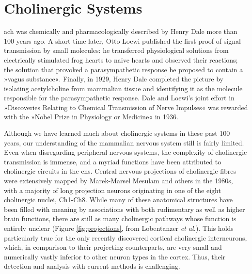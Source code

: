 \section{Cholinergic Systems}
 \Ac{ach} was chemically and pharmacologically described by Henry Dale more than 100 years ago.\cite{Dale1914} A short time later, Otto Loewi published the first proof of signal transmission by small molecules: he transferred physiological solutions from electrically stimulated frog hearts to naive hearts and observed their reactions; the solution that provoked a parasympathetic response he proposed to contain a »vagus substance«.\cite{Loewi1921} Finally, in 1929, Henry Dale completed the picture by isolating acetylcholine from mammalian tissue and identifying it as the molecule responsible for the parasympathetic response.\cite{Dale1929} Dale and Loewi's joint effort in »Discoveries Relating to Chemical Transmission of Nerve Impulses« was rewarded with the »Nobel Prize in Physiology or Medicine« in 1936.

Although we have learned much about cholinergic systems in these past 100 years, our understanding of the mammalian nervous system still is fairly limited. Even when disregarding peripheral nervous systems, the complexity of cholinergic transmission is immense, and a myriad functions have been attributed to cholinergic circuits in the \ac{cns}. Central nervous projections of cholinergic fibres were extensively mapped by Marek-Marsel Mesulam and others in the 1980s,\cite{Mesulam1984, Mesulam1988} with a majority of long projection neurons originating in one of the eight cholinergic nuclei, Ch1-Ch8. While many of these anatomical structures have been filled with meaning by associations with both rudimentary as well as higher brain functions, there are still as many cholinergic pathways whose function is entirely unclear (Figure \ref{fig:projections}, from Lobentanzer \emph{et al.}\cite{Lobentanzer2019a}). This holds particularly true for the only recently discovered cortical cholinergic interneurons, which, in comparison to their projecting counterparts, are very small and numerically vastly inferior to other neuron types in the cortex. Thus, their detection and analysis with current methods is challenging. 

